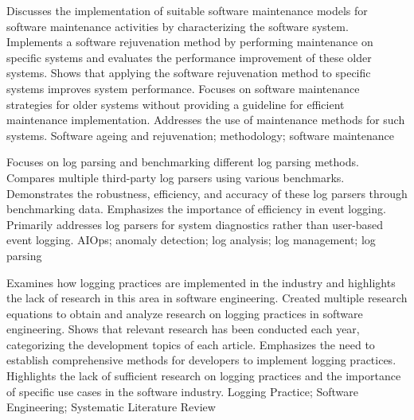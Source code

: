 {
    Discusses the implementation of suitable software maintenance models for software maintenance activities by characterizing the software system.
}
{
    Implements a software rejuvenation method by performing maintenance on specific systems and evaluates the performance improvement of these older systems.
}
{
    Shows that applying the software rejuvenation method to specific systems improves system performance.
}
{
    Focuses on software maintenance strategies for older systems without providing a guideline for efficient maintenance implementation. Addresses the use of maintenance methods for such systems.
}
{
    Software ageing and rejuvenation; methodology; software maintenance
}

{
    Focuses on log parsing and benchmarking different log parsing methods.
}
{
    Compares multiple third-party log parsers using various benchmarks.
}
{
    Demonstrates the robustness, efficiency, and accuracy of these log parsers through benchmarking data.
}
{
    Emphasizes the importance of efficiency in event logging. Primarily addresses log parsers for system diagnostics rather than user-based event logging.
}
{
    AIOps; anomaly detection; log analysis; log management; log parsing
}

{
    Examines how logging practices are implemented in the industry and highlights the lack of research in this area in software engineering.
}
{
    Created multiple research equations to obtain and analyze research on logging practices in software engineering.
}
{
    Shows that relevant research has been conducted each year, categorizing the development topics of each article.
}
{
    Emphasizes the need to establish comprehensive methods for developers to implement logging practices. Highlights the lack of sufficient research on logging practices and the importance of specific use cases in the software industry.
}
{
    Logging Practice; Software Engineering; Systematic Literature Review
}

